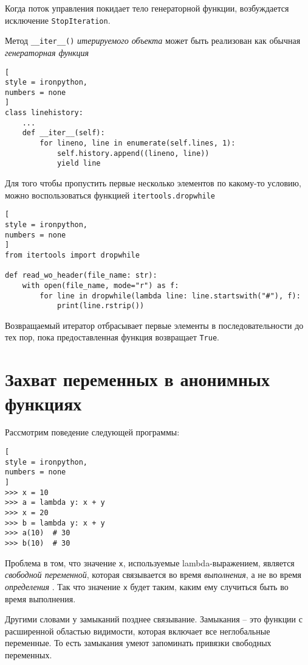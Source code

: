 \documentclass[%
	11pt,
	a4paper,
	utf8,
		]{article}
\begin{document}
Когда поток управления покидает тело генераторной функции, возбуждается исключение \texttt{StopIteration}.

Метод \verb|__iter__()| \emph{итерируемого объекта} может быть реализован как обычная \emph{генераторная функция} \cite[]{beazley:python_cookbook-2019}
\begin{lstlisting}[
style = ironpython,
numbers = none
]
class linehistory:
    ...
    def __iter__(self):
        for lineno, line in enumerate(self.lines, 1):
            self.history.append((lineno, line))
            yield line
\end{lstlisting}

Для того чтобы пропустить первые несколько элементов по какому-то условию, можно воспользоваться функцией \texttt{itertools.dropwhile}
\begin{lstlisting}[
style = ironpython,
numbers = none
]
from itertools import dropwhile

def read_wo_header(file_name: str):
    with open(file_name, mode="r") as f:
        for line in dropwhile(lambda line: line.startswith("#"), f):
            print(line.rstrip())
\end{lstlisting}

Возвращаемый итератор отбрасывает первые элементы в последовательности до тех пор, пока предоставленная функция возвращает \texttt{True}.

\section{Захват переменных в анонимных функциях}

Рассмотрим поведение следующей программы:
\begin{lstlisting}[
style = ironpython,
numbers = none
]
>>> x = 10
>>> a = lambda y: x + y
>>> x = 20
>>> b = lambda y: x + y
>>> a(10)  # 30
>>> b(10)  # 30
\end{lstlisting}

Проблема в том, что значение \texttt{x}, используемые lambda-выражением, является \emph{свободной переменной}, которая связывается во время \emph{выполнения}, а не во время \emph{определения} \cite[]{beazley:python_cookbook-2019}. Так что значение \texttt{x} будет таким, каким ему случиться быть во время выполнения.


Другими словами у замыканий позднее связывание. Замыкания -- это функции с расширенной областью видимости, которая включает все неглобальные переменные. То есть замыкания умеют запоминать привязки свободных переменных.
\end{document}
